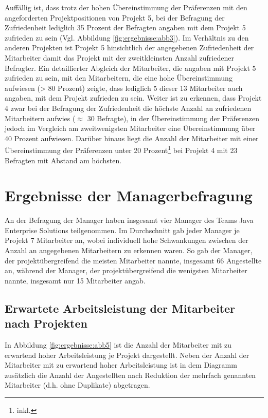 Auffällig ist, dass trotz der hohen Übereinstimmung der Präferenzen mit den angeforderten Projektpositionen von Projekt 5, bei der Befragung der Zufriedenheit lediglich 35 Prozent der Befragten angaben mit dem Projekt 5 zufrieden zu sein (Vgl. Abbildung \ref{fig:ergebnisse:abb3}).
Im Verhältnis zu den anderen Projekten ist Projekt 5 hinsichtlich der angegebenen Zufriedenheit der Mitarbeiter damit das Projekt mit der zweitkleinsten Anzahl zufriedener Befragter.
Ein detaillierter Abgleich der Mitarbeiter, die angaben mit Projekt 5 zufrieden zu sein, mit den Mitarbeitern, die eine hohe Übereinstimmung aufwiesen (> 80 Prozent) zeigte, dass lediglich 5 dieser 13 Mitarbeiter auch angaben, mit dem Projekt zufrieden zu sein.
Weiter ist zu erkennen, dass Projekt 4 zwar bei der Befragung der Zufriedenheit die höchste Anzahl an zufriedenen Mitarbeitern aufwies ($\approx$ 30 Befragte), in der Übereinstimmung der Präferenzen jedoch im Vergleich am zweitwenigsten Mitarbeiter eine Übereinstimmung über 40 Prozent aufwiesen.
Darüber hinaus liegt die Anzahl der Mitarbeiter mit einer Übereinstimmung der Präferenzen unter 20 Prozent\footnote{inkl.} bei Projekt 4 mit 23 Befragten mit Abstand am höchsten.

\section{Ergebnisse der Managerbefragung}
An der Befragung der Manager haben insgesamt vier Manager des Teams Java Enterprise Solutions teilgenommen.
Im Durchschnitt gab jeder Manager je Projekt 7 Mitarbeiter an, wobei individuell hohe Schwankungen zwischen der Anzahl an angegebenen Mitarbeitern zu erkennen waren.
So gab der Manager, der projektübergreifend die meisten Mitarbeiter nannte, insgesamt 66 Angestellte an, während der Manager, der projektübergreifend die wenigsten Mitarbeiter nannte, insgesamt nur 15 Mitarbeiter angab.

\subsection{Erwartete Arbeitsleistung der Mitarbeiter nach Projekten}
In Abbildung \ref{fig:ergebnisse:abb5} ist die Anzahl der Mitarbeiter mit zu erwartend hoher Arbeitsleistung je Projekt dargestellt.
Neben der Anzahl der Mitarbeiter mit zu erwartend hoher Arbeitsleistung ist in dem Diagramm zusätzlich die Anzahl der Angestellten nach Reduktion der mehrfach genannten Mitarbeiter (d.h. ohne Duplikate) abgetragen.


